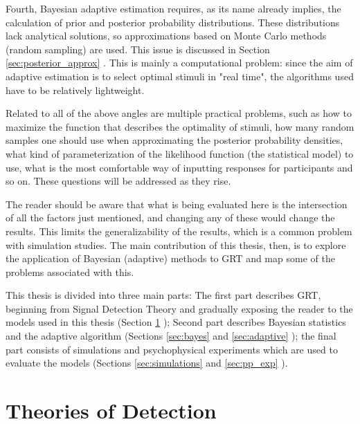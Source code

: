 \documentclass{article}\usepackage{knitr}
\begin{document}
Fourth, Bayesian adaptive estimation requires, as its name already implies, the calculation of prior and posterior probability distributions. These distributions lack analytical solutions,  so approximations based on Monte Carlo methods (random sampling) are used. This issue is discussed in Section \ref{sec:posterior_approx} \textit{}. This is mainly a computational problem: since the aim of adaptive estimation is to select optimal stimuli in "real time", the algorithms used have to be relatively lightweight.

Related to all of the above angles are multiple practical problems, such as how to maximize the function that describes the optimality of stimuli, how many random samples one should use when approximating the posterior probability densities, what kind of parameterization of the likelihood function (the statistical model) to use, what is the most comfortable way of inputting responses for participants and so on. These questions will be addressed as they rise.

The reader should be aware that what is being evaluated here is the intersection of all the factors just mentioned, and changing any of these would change the results. This limits the generalizability of the results, which is a common problem with simulation studies. The main contribution of this thesis, then, is to explore the application of Bayesian (adaptive) methods to GRT and map some of the problems associated with this.

This thesis is divided into three main parts: The first part describes GRT, beginning from Signal Detection Theory and gradually exposing the reader to the models used in this thesis (Section \ref{sec:GRT} \textit{}); Second part describes Bayesian statistics and the adaptive algorithm (Sections \ref{sec:bayes} \textit{} and \ref{sec:adaptive} \textit{}); the final part consists of simulations and psychophysical experiments which are used to evaluate the models (Sections \ref{sec:simulations} \textit{} and \ref{sec:pp_exp} \textit{}).

\newpage


\section{Theories of Detection}
\label{sec:GRT}
\end{document}
